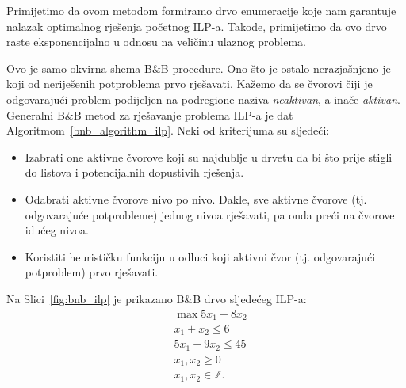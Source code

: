 \documentclass[a4paper, utf8, 11pt, colorlinks]{book}
\begin{document}
Primijetimo da ovom metodom formiramo drvo enumeracije koje nam garantuje nalazak optimalnog rješenja početnog ILP-a. Takođe, primijetimo da ovo drvo raste eksponencijalno u odnosu na veličinu ulaznog problema. 

  Ovo je samo okvirna shema B\&B procedure. Ono što je ostalo nerazjašnjeno je koji od neriješenih potproblema prvo rješavati. Kažemo da se čvorovi čiji je odgovarajući problem podijeljen na podregione naziva \emph{neaktivan}, a inače \emph{aktivan}. Generalni B\&B metod za rješavanje problema ILP-a je dat   Algoritmom~\ref{bnb_algorithm_ilp}.  Neki od kriterijuma su sljedeći:
  \begin{itemize}
  	\item Izabrati one aktivne čvorove koji su najdublje u drvetu da bi što prije stigli do listova i potencijalnih dopustivih rješenja.
  	\item Odabrati aktivne čvorove nivo po nivo. Dakle, sve aktivne čvorove (tj. odgovarajuće potprobleme) jednog nivoa   rješavati, pa onda preći na čvorove idućeg nivoa. 
  	\item Koristiti heurističku funkciju u odluci koji aktivni čvor (tj. odgovarajući potproblem) prvo rješavati. 
  \end{itemize}

Na Slici~\ref{fig:bnb_ilp} je prikazano B\&B drvo sljedećeg ILP-a:
\begin{align*}
    &\max 5 x_1 + 8 x_2 \\
    &x_1 + x_2 \leq 6 \\
    & 5 x_1 + 9 x_2 \leq 45 \\
    & x_1, x_2 \geq 0\\
    & x_1,x_2 \in \mathbb{Z}.
\end{align*}

\end{document}
